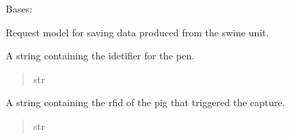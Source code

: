 \documentclass[letterpaper,10pt,english]{sphinxmanual}
\begin{document}

\begin{fulllineitems}
\label{\detokenize{modules/src.pig_sorting_api.main:src.pig_sorting_api.main.SwineDataSave}}
\pysigstartsignatures
\pysiglinewithargsret
{}
{\sphinxparamcomma {}}
{}
\pysigstopsignatures
\sphinxAtStartPar
Bases: 

\sphinxAtStartPar
Request model for saving data produced from the swine unit.

\begin{fulllineitems}
\label{\detokenize{modules/src.pig_sorting_api.main:src.pig_sorting_api.main.SwineDataSave.pen}}
\pysigstartsignatures
\pysigline
{}
\pysigstopsignatures
\sphinxAtStartPar
A string containing the idetifier for the pen.
\begin{quote}\begin{description}
\sphinxAtStartPar
str

\end{description}\end{quote}

\end{fulllineitems}


\begin{fulllineitems}
\label{\detokenize{modules/src.pig_sorting_api.main:src.pig_sorting_api.main.SwineDataSave.rfid}}
\pysigstartsignatures
\pysigline
{}
\pysigstopsignatures
\sphinxAtStartPar
A string containing the rfid of the pig that triggered the capture.
\begin{quote}\begin{description}
\sphinxAtStartPar
str


\end{description}
\end{quote}
\end{fulllineitems}
\end{fulllineitems}
\end{document}

